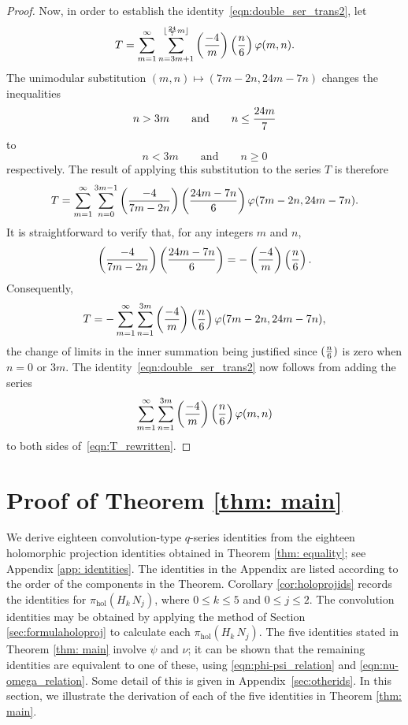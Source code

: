 \documentclass[11pt,reqno]{amsart}
\newcommand{\holoproj}[1]{\pi_{\mathrm{hol}}\left(#1\right)}
\renewcommand{\=}{\;=\;}
\theoremstyle{myremark}
\begin{document}
\begin{proof}
Now, in order to establish the identity~\eqref{eqn:double_ser_trans2}, let
\[ T= \sum_{m=1}^\infty \sum_{n=3m+1}^{\lfloor {24 \over 7}m \rfloor} \left({-4 \over m}\right) \left({n \over 6}\right) \varphi(m,n). \]
The unimodular substitution $(m,n) \mapsto (7m-2n,24m-7n)$ changes the inequalities
\[ n > 3m \qquad \text{and} \qquad n \leq {24m \over 7} \]
to
\[ n < 3m \qquad \text{and} \qquad n \geq 0 \]
respectively. 
The result of applying this substitution to the series $T$ is therefore
\[ T = \sum_{m=1}^\infty \sum_{n=0}^{3m-1} \left({-4 \over 7m-2n}\right) \left({24m-7n \over 6}\right) \varphi(7m-2n,24m-7n). \]
It is straightforward to verify that, for any integers $m$ and $n$,
\[ \left({-4 \over 7m-2n}\right) \left({24m-7n \over 6}\right) = -\left({-4 \over m}\right) \left({n \over 6}\right). \]
Consequently,
\begin{equation} \label{eqn:T_rewritten}
T = -\sum_{m=1}^\infty \sum_{n=1}^{3m} \left({-4 \over m}\right) \left({n \over 6}\right) \varphi(7m-2n,24m-7n),
\end{equation}
the change of limits in the inner summation being justified since $({n\over6})$ is zero when $n=0$ or $3m$. 
The identity~\eqref{eqn:double_ser_trans2} now follows from adding the series
\[ \sum_{m=1}^\infty \sum_{n=1}^{3m} \left({-4 \over m}\right) \left({n \over 6}\right) \varphi(m,n) \]
to both sides of~\eqref{eqn:T_rewritten}.
\end{proof}

\section{\textbf{Proof of Theorem \ref{thm: main}}}
\label{sec:proofmain}
We derive eighteen convolution-type $q$-series identities from the eighteen holomorphic projection identities obtained in Theorem \ref{thm: equality}; see Appendix \ref{app: identities}. 
The identities in the Appendix are listed according to the order of the components in the Theorem. 
Corollary \ref{cor:holoprojids} records the identities for $\holoproj{H_{k} \, N_j}$, where $0 \le k \le 5$ and $0 \le j \le2$. 
The convolution identities may be obtained by applying the method of Section \ref{sec:formulaholoproj} to calculate each  $\holoproj{H_{k}\, N_j}$. 
The five identities stated in Theorem \ref{thm: main} involve $\psi$ and $\nu$; it
can be shown that the remaining identities are equivalent to one of these, 
using \eqref{eqn:phi-psi_relation} and \eqref{eqn:nu-omega_relation}.
Some detail of this is given in Appendix~\ref{sec:otherids}.
In this section, we illustrate the derivation of each of
the five identities in Theorem \ref{thm: main}. 
\end{document}
